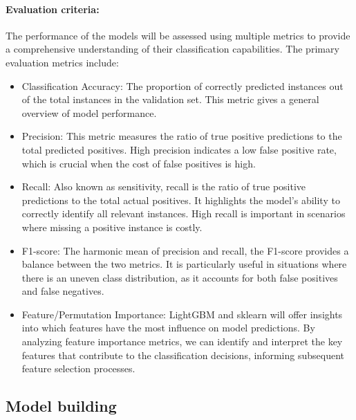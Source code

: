 \documentclass[a4paper,11pt]{article}
\begin{document}
\paragraph{Evaluation criteria:}  
The performance of the models will be assessed using multiple metrics to provide a comprehensive understanding of their classification capabilities. The primary evaluation metrics include:
\begin{itemize}
    \item Classification Accuracy: The proportion of correctly predicted instances out of the total instances in the validation set. This metric gives a general overview of model performance.
    \item Precision: This metric measures the ratio of true positive predictions to the total predicted positives. High precision indicates a low false positive rate, which is crucial when the cost of false positives is high.
    \item Recall: Also known as sensitivity, recall is the ratio of true positive predictions to the total actual positives. It highlights the model's ability to correctly identify all relevant instances. High recall is important in scenarios where missing a positive instance is costly.
    \item F1-score: The harmonic mean of precision and recall, the F1-score provides a balance between the two metrics. It is particularly useful in situations where there is an uneven class distribution, as it accounts for both false positives and false negatives.
    \item Feature/Permutation Importance: LightGBM and sklearn will offer insights into which features have the most influence on model predictions. By analyzing feature importance metrics, we can identify and interpret the key features that contribute to the classification decisions, informing subsequent feature selection processes.
\end{itemize}

\subsection{Model building}
\end{document}
